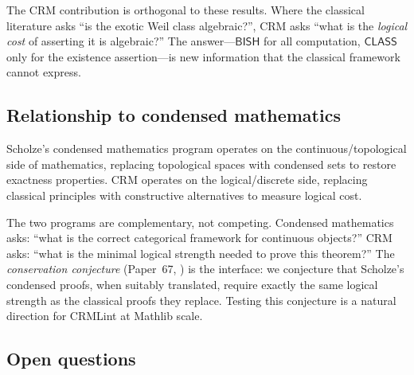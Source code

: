 \documentclass[11pt]{article}
\theoremstyle{plain}
\theoremstyle{definition}
\theoremstyle{remark}
\newcommand{\BISH}{\mathsf{BISH}}
\newcommand{\CLASS}{\mathsf{CLASS}}
\begin{document}
The CRM contribution is orthogonal to these results.  Where the
classical literature asks ``is the exotic Weil class algebraic?'',
CRM asks ``what is the \emph{logical cost} of asserting it is
algebraic?''  The answer---$\BISH$ for all computation,
$\CLASS$ only for the existence assertion---is new information
that the classical framework cannot express.

\subsection{Relationship to condensed mathematics}

Scholze's condensed mathematics program \cite{scholze-condensed}
operates on the continuous/topological side of mathematics,
replacing topological spaces with condensed sets to restore
exactness properties.  CRM operates on the logical/discrete side,
replacing classical principles with constructive alternatives to
measure logical cost.

The two programs are complementary, not competing.  Condensed
mathematics asks: ``what is the correct categorical framework for
continuous objects?''  CRM asks: ``what is the minimal logical
strength needed to prove this theorem?''  The \emph{conservation
conjecture} (Paper~67, \cite{p67}) is the interface: we conjecture
that Scholze's condensed proofs, when suitably translated, require
exactly the same logical strength as the classical proofs they
replace.  Testing this conjecture is a natural direction for
CRMLint at Mathlib scale.

\subsection{Open questions}
\end{document}
